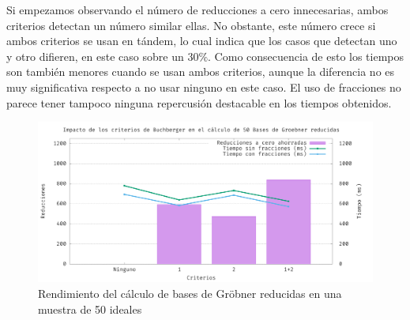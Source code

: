Si empezamos observando el número de reducciones a cero innecesarias, ambos criterios detectan un número similar ellas. No obstante, este número crece si ambos criterios se usan en tándem, lo cual indica que los casos que detectan uno y otro difieren, en este caso sobre un $30\%$. Como consecuencia de esto los tiempos son también menores cuando se usan ambos criterios, aunque la diferencia no es muy significativa respecto a no usar ninguno en este caso. El uso de fracciones no parece tener tampoco ninguna repercusión destacable en los tiempos obtenidos.\newline
\begin{figure}[!ht]
    \centering
    \includegraphics[width=\textwidth]{Plantilla-TFG-master/img/graficas/Criterios50-2.png}
    \caption{Rendimiento del cálculo de bases de Gröbner reducidas en una muestra de 50 ideales}
    \label{fig:criterios50}
\end{figure}

